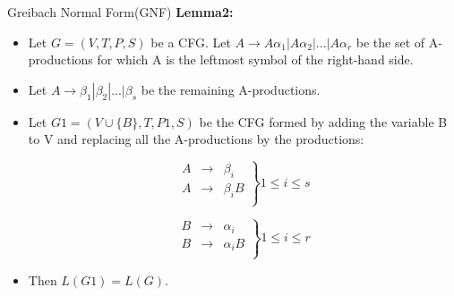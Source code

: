 \documentclass{beamer}
\begin{document}
\begin{frame}{Greibach Normal Form(GNF)}
	\textbf{Lemma2:}
	\begin{itemize}
		\item Let $G = (V, T, P, S)$ be a CFG. Let $A\rightarrow A\alpha_1 | A\alpha_2 |...| A\alpha_r$ be
		the set of A-productions for which A is the leftmost symbol of the right-hand 
		side.
		\item Let $A \rightarrow  \beta_1 | \beta_2|...|\beta_s$ be the remaining A-productions. 
		\item Let $G1 = (V\cup \{B\}, T, P1, S)$ be the CFG formed by adding the variable B to V and 	replacing all the A-productions by the productions:

		\begin{multicols}{2}
			\begin{equation*}
				\left.\begin{aligned}
					A &\rightarrow& \beta_i\\
					A &\rightarrow& \beta_iB\\
				\end{aligned}\right\}  1\leq i \leq s
			\end{equation*}
							
			\columnbreak
			\begin{equation*}
			\left.\begin{aligned}
				B &\rightarrow& \alpha_i\\
				B &\rightarrow& \alpha_iB\\
			\end{aligned}\right\}  1\leq i \leq r
		\end{equation*}
		\end{multicols}
	\item Then $L(G1) = L(G).$
	\end{itemize}
\end{frame}
\end{document}
